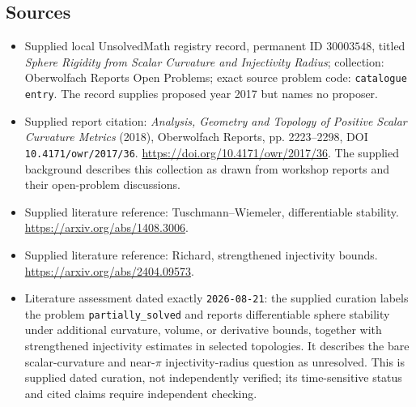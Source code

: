 \documentclass[11pt]{article}
\begin{document}
\subsection{Sources}
\begin{itemize}
\item Supplied local UnsolvedMath registry record, permanent ID \(30003548\), titled \emph{Sphere Rigidity from Scalar Curvature and Injectivity Radius}; collection: Oberwolfach Reports Open Problems; exact source problem code: \texttt{catalogue entry}. The record supplies proposed year 2017 but names no proposer.
\item Supplied report citation: \emph{Analysis, Geometry and Topology of Positive Scalar Curvature Metrics} (2018), Oberwolfach Reports, pp. 2223--2298, DOI \texttt{10.4171/owr/2017/36}. \url{https://doi.org/10.4171/owr/2017/36}. The supplied background describes this collection as drawn from workshop reports and their open-problem discussions.
\item Supplied literature reference: Tuschmann--Wiemeler, differentiable stability. \url{https://arxiv.org/abs/1408.3006}.
\item Supplied literature reference: Richard, strengthened injectivity bounds. \url{https://arxiv.org/abs/2404.09573}.
\item Literature assessment dated exactly \texttt{2026-08-21}: the supplied curation labels the problem \texttt{partially\_solved} and reports differentiable sphere stability under additional curvature, volume, or derivative bounds, together with strengthened injectivity estimates in selected topologies. It describes the bare scalar-curvature and near-\(\pi\) injectivity-radius question as unresolved. This is supplied dated curation, not independently verified; its time-sensitive status and cited claims require independent checking.
\end{itemize}
\end{document}
